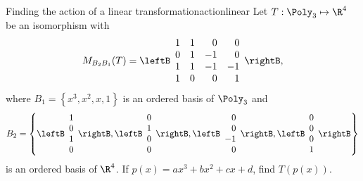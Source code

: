 \begin{example}{Finding the action of a linear transformation}{actionlinear}
Let $T: \Poly_3 \mapsto \R^4$ be an isomorphism with
\[
M_{B_2B_1}(T) = \leftB \begin{array}{rrrr}
1 & 1 & 0 & 0 \\
0 & 1 & -1 & 0 \\
1 & 1 & -1 & -1 \\
1 & 0 & 0 & 1 
\end{array} \rightB,
\]
where $B_1 = \left\{ x^3, x^2, x, 1 \right\}$ is an ordered basis of $\Poly_3$ and 
\[
B_2 = \left\{ \leftB \begin{array}{r}
1 \\
0 \\
1 \\
0
\end{array} \rightB, \leftB \begin{array}{r}
0 \\
1 \\
0 \\
0
\end{array} \rightB, 
\leftB \begin{array}{r}
0 \\
0 \\
-1 \\
0
\end{array} \rightB, 
\leftB \begin{array}{r}
0 \\
0 \\
0 \\
1
\end{array} \rightB \right\} 
\]
is an ordered basis of $\R^4$. If $p(x) = ax^3 + bx^2 + cx + d$, find $T(p(x))$. 
\end{example}

